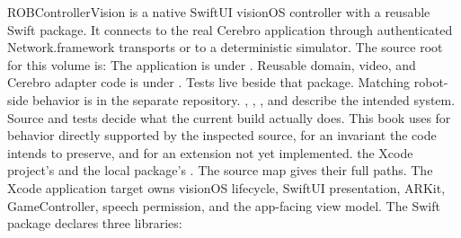 \markdownRendererDocumentBegin
\markdownRendererSectionBegin
{}\markdownRendererInterblockSeparator
{}ROBControllerVision is a native SwiftUI visionOS controller with a reusable Swift package. It connects to the real Cerebro application through authenticated Network.framework transports or to a deterministic simulator. The source root for this volume is:\markdownRendererInterblockSeparator
{}\markdownRendererInterblockSeparator
{}The application is under . Reusable domain, video, and Cerebro adapter code is under . Tests live beside that package. Matching robot-side behavior is in the separate  repository.\markdownRendererInterblockSeparator
{}\markdownRendererBlockQuoteBegin
{} , , , and  describe the intended system. Source and tests decide what the current build actually does.\markdownRendererBlockQuoteEnd \markdownRendererInterblockSeparator
{}This book uses  for behavior directly supported by the inspected source,  for an invariant the code intends to preserve, and  for an extension not yet implemented.\markdownRendererInterblockSeparator
{}
\markdownRendererSectionEnd \markdownRendererSectionBegin
{}\markdownRendererInterblockSeparator
{}\markdownRendererBlockQuoteBegin
{} the Xcode project's  and the local package's . The source map gives their full paths.\markdownRendererBlockQuoteEnd \markdownRendererInterblockSeparator
{}The Xcode application target owns visionOS lifecycle, SwiftUI presentation, ARKit, GameController, speech permission, and the app-facing view model. The Swift package declares three libraries:\markdownRendererInterblockSeparator
{}\markdownRendererUlBegin
